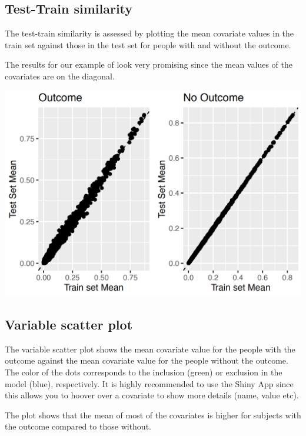 \documentclass[]{book}
\begin{document}
\newpage

\subsection{Test-Train similarity}\label{test-train-similarity}

The test-train similarity is assessed by plotting the mean covariate
values in the train set against those in the test set for people with
and without the outcome.

The results for our example of look very promising since the mean values
of the covariates are on the diagonal.

\includegraphics{images/PatientLevelPrediction/generalizability.png}

\newpage

\subsection{Variable scatter plot}\label{variable-scatter-plot}

The variable scatter plot shows the mean covariate value for the people
with the outcome against the mean covariate value for the people without
the outcome. The color of the dots corresponds to the inclusion (green)
or exclusion in the model (blue), respectively. It is highly recommended
to use the Shiny App since this allows you to hoover over a covariate to
show more details (name, value etc).

The plot shows that the mean of most of the covariates is higher for
subjects with the outcome compared to those without.
\end{document}
